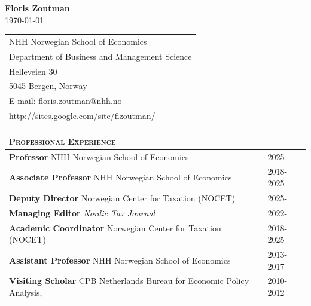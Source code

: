 \documentclass [11pt]{article}
\newcommand{\kiss}
{\vspace{0.5cm}}
\newcommand{\first} 
{13.8}
\newcommand{\second}
{2.5}
\newcommand{\thickrule}{\toprule}
\newcommand{\ttitle}[1]{\scshape{\Large {#1}}}
\begin{document}
\kiss
\begin{center}
{\Large \textbf{Floris Zoutman}}\\
\today
\end{center}


\begin{singlespace}
\begin{tabular}[t] { p{16.75cm}  }
\thickrule
NHH Norwegian School of Economics	 
\\
Department of Business and Management Science 
\\
Helleveien 30 
\\
5045 Bergen, Norway 
\\
E-mail: floris.zoutman@nhh.no
\\
\href{https://sites.google.com/site/flzoutman/}{http:/\!/sites.google.com/site/flzoutman/}
\end{tabular}
\end{singlespace}

\vspace{0.2cm}


\kiss

\begin{tabular}[t] {p{\first cm} p{\second cm} }
\ttitle{Professional Experience} &
\\
\thickrule
\textbf{Professor} NHH Norwegian School of Economics & 2025-\\
\textbf{Associate Professor} NHH Norwegian School of Economics & 2018-2025\\
\textbf{Deputy Director} Norwegian Center for Taxation (NOCET) & 2025-\\
\textbf{Managing Editor} \emph{Nordic Tax Journal} & 2022-\\
\textbf{Academic Coordinator} Norwegian Center for Taxation (NOCET) & 2018-2025\\
\textbf{Assistant Professor} NHH Norwegian School of Economics & 2013-2017\\
\textbf{Visiting Scholar} CPB Netherlands Bureau for Economic Policy Analysis,  & 2010-2012 \\

\end{tabular}
\end{document}
